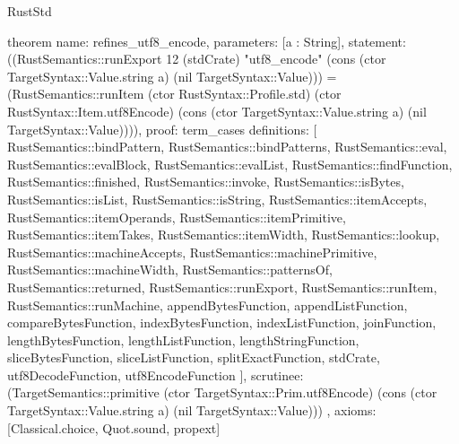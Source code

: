 \begin{lexlean}{RustStd}
\begin{semanticmodule}
theorem{
  name: refines_utf8_encode,
  parameters: [a : String],
  statement: ((RustSemantics::runExport 12 (stdCrate) "utf8_encode" (cons (ctor TargetSyntax::Value.string a) (nil TargetSyntax::Value))) = (RustSemantics::runItem (ctor RustSyntax::Profile.std) (ctor RustSyntax::Item.utf8Encode) (cons (ctor TargetSyntax::Value.string a) (nil TargetSyntax::Value)))),
  proof: term_cases{
    definitions: [
      RustSemantics::bindPattern,
      RustSemantics::bindPatterns,
      RustSemantics::eval,
      RustSemantics::evalBlock,
      RustSemantics::evalList,
      RustSemantics::findFunction,
      RustSemantics::finished,
      RustSemantics::invoke,
      RustSemantics::isBytes,
      RustSemantics::isList,
      RustSemantics::isString,
      RustSemantics::itemAccepts,
      RustSemantics::itemOperands,
      RustSemantics::itemPrimitive,
      RustSemantics::itemTakes,
      RustSemantics::itemWidth,
      RustSemantics::lookup,
      RustSemantics::machineAccepts,
      RustSemantics::machinePrimitive,
      RustSemantics::machineWidth,
      RustSemantics::patternsOf,
      RustSemantics::returned,
      RustSemantics::runExport,
      RustSemantics::runItem,
      RustSemantics::runMachine,
      appendBytesFunction,
      appendListFunction,
      compareBytesFunction,
      indexBytesFunction,
      indexListFunction,
      joinFunction,
      lengthBytesFunction,
      lengthListFunction,
      lengthStringFunction,
      sliceBytesFunction,
      sliceListFunction,
      splitExactFunction,
      stdCrate,
      utf8DecodeFunction,
      utf8EncodeFunction
    ],
    scrutinee: (TargetSemantics::primitive (ctor TargetSyntax::Prim.utf8Encode) (cons (ctor TargetSyntax::Value.string a) (nil TargetSyntax::Value)))
  },
  axioms: [Classical.choice, Quot.sound, propext]
}


\end{semanticmodule}
\end{lexlean}
